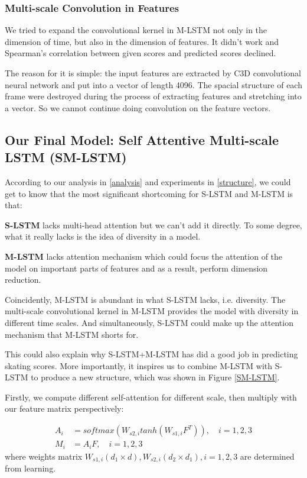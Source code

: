 \documentclass{article}
\begin{document}
\subsubsection{Multi-scale Convolution in Features}
We tried to expand the convolutional kernel in M-LSTM not only in the dimension of time, but also in the dimension of features. It didn't work and Spearman's correlation between given scores and predicted scores declined.\par
The reason for it is simple: the input features are extracted by C3D convolutional neural network and put into a vector of length 4096. The spacial structure of each frame were destroyed during the process of extracting features and stretching into a vector. So we cannot continue doing convolution on the feature vectors.

\subsection{Our Final Model: Self Attentive Multi-scale LSTM (SM-LSTM)}
According to our analysis in \ref{analysis} and experiments in \ref{structure}, we could get to know that the most significant shortcoming for S-LSTM and M-LSTM is that:\par

\textbf{S-LSTM} lacks multi-head attention but we can't add it directly. To some degree, what it really lacks is the idea of diversity in a model.\par
\textbf{M-LSTM} lacks attention mechanism which could focus the attention of the model on important parts of features and as a result, perform dimension reduction.\par

Coincidently, M-LSTM is abundant in what S-LSTM lacks, i.e. diversity. The multi-scale convolutional kernel in M-LSTM provides the model with diversity in different time scales. And simultaneously, S-LSTM could make up the attention mechanism that M-LSTM shorts for.\par
This could also explain why S-LSTM+M-LSTM has did a good job in predicting skating scores. More importantly, it inspires us to combine M-LSTM with S-LSTM to produce a new structure, which was shown in Figure \ref{SM-LSTM}.\par

Firstly, we compute different self-attention for different scale, then multiply with our feature matrix perspectively:

\begin{align}
A_i &= softmax\left(W_{s2,i}tanh\left(W_{s1,i}F^T\right)\right), \quad i=1,2,3\\
M_i &= A_iF, \quad i=1,2,3
\end{align}
where weights matrix $W_{s1,i}(d_1\times d), W_{s2,i}(d_2\times d_1),i=1,2,3$ are determined from learning.\par
\end{document}
